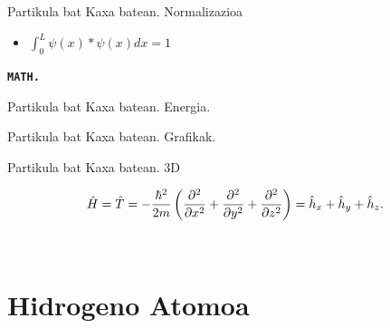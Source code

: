 \documentclass[xcolor=x11names,table]{beamer}
\begin{document}
\begin{frame}{Partikula bat Kaxa batean. Normalizazioa}
	\begin{itemize}
		\item $  \int^L_0 \psi(x)*\psi(x) dx =1 $
	\end{itemize}
	{\tt \bf MATH. }

\end{frame}

\begin{frame}{Partikula bat Kaxa batean. Energia.}


\end{frame}
\begin{frame}{Partikula bat Kaxa batean. Grafikak.}

\end{frame}





\begin{frame}{Partikula bat Kaxa batean. 3D}
	
\begin{equation*}
\Hat{H}=\Hat{T}=-\dfrac{\hbar^{2}}{2m}\left(\dfrac{\partial^{2}}{\partial x^{2}}+\dfrac{\partial^{2}}{\partial y^{2}}+\dfrac{\partial^{2}}{\partial z^{2}}\right)=\Hat{h}_{x}+\Hat{h}_{y}+\Hat{h}_{z}.
\end{equation*}

\begin{center}
\\
\vspace{0.7cm}
\end{center}
%
\end{frame}

\section{ Hidrogeno Atomoa }
\end{document}
